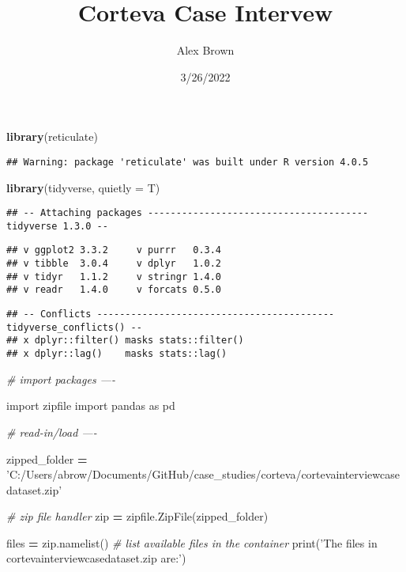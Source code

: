 \documentclass[
]{article}
\title{Corteva Case Intervew}
\author{Alex Brown}
\date{3/26/2022}
\newenvironment{Shaded}{\begin{snugshade}}{\end{snugshade}}
\newcommand{\BuiltInTok}[1]{#1}
\newcommand{\CommentTok}[1]{\textcolor[rgb]{0.56,0.35,0.01}{\textit{#1}}}
\newcommand{\DataTypeTok}[1]{\textcolor[rgb]{0.13,0.29,0.53}{#1}}
\newcommand{\ImportTok}[1]{#1}
\newcommand{\KeywordTok}[1]{\textcolor[rgb]{0.13,0.29,0.53}{\textbf{#1}}}
\newcommand{\NormalTok}[1]{#1}
\newcommand{\OperatorTok}[1]{\textcolor[rgb]{0.81,0.36,0.00}{\textbf{#1}}}
\newcommand{\StringTok}[1]{\textcolor[rgb]{0.31,0.60,0.02}{#1}}
\begin{document}
\maketitle

\begin{Shaded}
\begin{Highlighting}[]
\KeywordTok{library}\NormalTok{(reticulate)}
\end{Highlighting}
\end{Shaded}

\begin{verbatim}
## Warning: package 'reticulate' was built under R version 4.0.5
\end{verbatim}

\begin{Shaded}
\begin{Highlighting}[]
\KeywordTok{library}\NormalTok{(tidyverse, }\DataTypeTok{quietly =}\NormalTok{ T)}
\end{Highlighting}
\end{Shaded}

\begin{verbatim}
## -- Attaching packages --------------------------------------- tidyverse 1.3.0 --
\end{verbatim}

\begin{verbatim}
## v ggplot2 3.3.2     v purrr   0.3.4
## v tibble  3.0.4     v dplyr   1.0.2
## v tidyr   1.1.2     v stringr 1.4.0
## v readr   1.4.0     v forcats 0.5.0
\end{verbatim}

\begin{verbatim}
## -- Conflicts ------------------------------------------ tidyverse_conflicts() --
## x dplyr::filter() masks stats::filter()
## x dplyr::lag()    masks stats::lag()
\end{verbatim}

\begin{Shaded}
\begin{Highlighting}[]
\CommentTok{# import packages ----}

\ImportTok{import}\NormalTok{ zipfile}
\ImportTok{import}\NormalTok{ pandas }\ImportTok{as}\NormalTok{ pd}
\end{Highlighting}
\end{Shaded}

\begin{Shaded}
\begin{Highlighting}[]
\CommentTok{# read-in/load ----}

\NormalTok{zipped_folder }\OperatorTok{=} \StringTok{'C:/Users/abrow/Documents/GitHub/case_studies/corteva/cortevainterviewcasedataset.zip'}

\CommentTok{# zip file handler  }
\BuiltInTok{zip} \OperatorTok{=}\NormalTok{ zipfile.ZipFile(zipped_folder)}

\NormalTok{files }\OperatorTok{=} \BuiltInTok{zip}\NormalTok{.namelist()}
\CommentTok{# list available files in the container}
\BuiltInTok{print}\NormalTok{(}\StringTok{'The files in cortevainterviewcasedataset.zip are:'}\NormalTok{)}
\end{Highlighting}
\end{Shaded}
\end{document}
